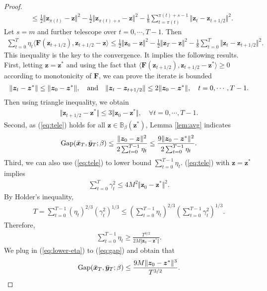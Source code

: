 \documentclass{article}
\def\vx{{\bm{x}}}
\def\vy{{\bm{y}}}
\def\vz{{\bm{z}}}
\def\mF{{\bm{F}}}
\def\sB{{\mathbb{B}}}
\theoremstyle{plain}
\begin{document}
\begin{proof}
\begin{align*}
    &\le \frac{1}{2} \Vert \vz_{\pi(t)} - \vz \Vert^2 - \frac{1}{2} \Vert \vz_{\pi(t)+s}  - \vz \Vert^2 -  \frac{1}{8 }  \sum_{t= \pi(t)}^{\pi(t)  +s -1}  \Vert \vz_t - \vz_{t+1/2} \Vert^2. 
\end{align*}
Let $s = m$ and
further telescope over $t = 0,\cdots,T-1$. Then
\begin{align} \label{eq:tele}
    \sum_{t= 0}^{T} \eta_t \langle  \mF(\vz_{t+1/2}), \vz_{t+1/2} - \vz \rangle \le \frac{1}{2} \Vert \vz_0 - \vz \Vert^2 - \frac{1}{2} \Vert \vz_{T} - \vz \Vert^2 - \frac{1}{8} \sum_{t=0}^T \Vert \vz_t - \vz_{t+1/2} \Vert^2.
\end{align}
This inequality is the key to the convergence. It implies the following results. First, letting $\vz = \vz^*$ and using the fact that $ \langle \mF(\vz_{t+1/2}), \vz_{t+1/2} - \vz^* \rangle \ge 0$ according to monotonicity of $\mF$, we can prove the iterate is bounded
\begin{align*}
    \Vert \vz_t - \vz^* \Vert \le \Vert \vz_0 - \vz^* \Vert, \quad {\rm and} \quad \Vert \vz_t - \vz_{t+1/2} \Vert \le 2 \Vert \vz_0 - \vz^* \Vert, \quad t =0,\cdots,T-1.
\end{align*}
Then using triangle inequality, we obtain
\begin{align*}
    \Vert \vz_{t+1/2} - \vz^* \Vert \le 3 \Vert \vz_0 - \vz^* \Vert, \quad \forall t = 0,\cdots,T-1.
\end{align*}
Second, as (\ref{eq:tele}) holds for all $\vz \in \sB_{\beta}(\vz^*)$, Lemma 
\ref{lem:avg} indicates
\begin{align} \label{eq:gap}
    {\rm Gap}(\bar \vx_T, \bar \vy_T; \beta) \le \frac{ \Vert \vz_0 - \vz \Vert^2 }{2 \sum_{t=0}^{T-1} \eta_t} \le \frac{ 9 \Vert \vz_0 - \vz^* \Vert^2 }{2 \sum_{t=0}^{T-1} \eta_t}.
\end{align}
Third, we can also use (\ref{eq:tele}) to lower bound $\sum_{t=0}^{T-1} \eta_t$. (\ref{eq:tele}) with $\vz = \vz^*$ implies 
\begin{align*}
    \sum_{t=0}^T \gamma_t^2 \le 4 M^2 \Vert \vz_0 - \vz^* \Vert^2.
\end{align*}
By Holder's inequality,
\begin{align*}
    T=  \sum_{t=0}^{T-1} \left(\eta_t\right)^{2/3} \left(\gamma_t^2\right)^{1/3} \le \left( \sum_{t=0}^{T-1} \eta_t \right)^{2/3} \left( \sum_{t=0}^{T-1} \gamma_t^2 \right)^{1/3}. 
\end{align*}
Therefore,
\begin{align} \label{eq:lower-eta}
\sum_{t=0}^{T-1} \eta_t \ge \frac{T^{3/2}}{2 M \Vert \vz_0 - \vz^* \Vert}.
\end{align}
We plug in (\ref{eq:lower-eta}) to (\ref{eq:gap}) and obtain that
\begin{align*}
    {\rm Gap}(\bar \vx_T, \bar \vy_T; \beta) \le \frac{9 M \Vert \vz_0  - \vz^* \Vert^3 }{T^{3/2}}.
\end{align*}
\end{proof}
\end{document}
